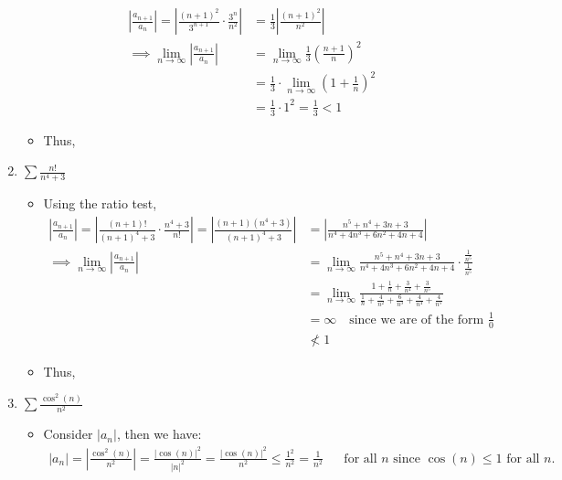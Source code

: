 \documentclass[10pt,a4paper]{article}
\theoremstyle{definition}
\begin{document}
\begin{enumerate}[label = (\alph*)]
\begin{itemize}
	\begin{align*}
	\left|\frac{a_{n+1}}{a_n}\right| = \left|\frac{(n+1)^2}{3^{n+1}} \cdot \frac{3^n}{n^2}\right| &= \frac{1}{3}\left|\frac{(n+1)^2}{n^2}\right|\\
	\implies \lim_{n \to \infty} \left|\frac{a_{n+1}}{a_n}\right| &= \lim_{n \to \infty} \frac{1}{3} \left(\frac{n + 1}{n}\right)^2\\
	&= \frac{1}{3} \cdot \lim_{n \to \infty} \left(1 + \frac{1}{n}\right)^2\\
	&= \frac{1}{3} \cdot 1^2 = \frac{1}{3} < 1
	\end{align*}
	\item Thus, 
	\end{itemize}
\item $\displaystyle \sum \frac{n!}{n^4 + 3}$
	\begin{itemize}
	\item Using the ratio test,
	\begin{align*}
	\left|\frac{a_{n+1}}{a_n}\right| = \left|\frac{(n+1)!}{(n+1)^4 + 3} \cdot \frac{n^4 + 3}{n!}\right| = \left|\frac{(n + 1)(n^4 + 3)}{(n + 1)^4 + 3}\right| &= \left|\frac{n^5 + n^4 + 3n + 3}{n^4 + 4n^3 + 6n^2 + 4n + 4}\right|\\
	\implies \lim_{n \to \infty} \left|\frac{a_{n+1}}{a_n}\right| &= \lim_{n \to \infty} \frac{n^5 + n^4 + 3n + 3}{n^4 + 4n^3 + 6n^2 + 4n + 4} \cdot \frac{\frac{1}{n^5}}{\frac{1}{n^5}}\\
	&= \lim_{n \to \infty} \frac{1 + \frac{1}{n} + \frac{3}{n^4} + \frac{3}{n^5}}{\frac{1}{n} + \frac{4}{n^2} + \frac{6}{n^3} + \frac{4}{n^4} + \frac{4}{n^5}}\\
	&= \infty \quad \text{since we are of the form $\frac{1}{0}$}\\
	&\not< 1
	\end{align*}
	\item Thus, 
	\end{itemize}
\item $\displaystyle \sum \frac{\cos^2(n)}{n^2}$
	\begin{itemize}
	\item Consider $|a_n|$, then we have:
	\begin{align*}
	|a_n| = \left|\frac{\cos^2(n)}{n^2}\right| = \frac{|\cos(n)|^2}{|n|^2} = \frac{|\cos(n)|^2}{n^2} \leq \frac{1^2}{n^2} = \frac{1}{n^2} &&\text{for all $n$ since $\cos(n) \leq 1$ for all $n$.}
	\end{align*}

\end{itemize}
\end{enumerate}
\end{document}
